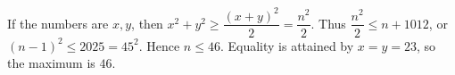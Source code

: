 If the numbers are $x,y$, then $x^2+y^2\ge\dfrac{(x+y)^2}{2}=\dfrac{n^2}{2}$. Thus $\dfrac{n^2}{2}\le n+1012$, or $(n-1)^2\le2025=45^2$. Hence $n\le46$. Equality is attained by $x=y=23$, so the maximum is $\boxed{46}$.
